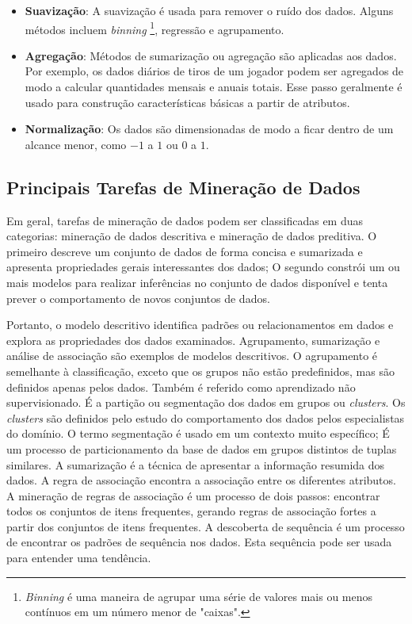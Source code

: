 \begin{itemize}
  \item 
  \textbf{Suavização}: A suavização é usada para remover o ruído dos dados. Alguns métodos incluem \textit{binning} \footnote{\textit{Binning} é uma maneira de agrupar uma série de valores mais ou menos contínuos em um número menor de "caixas".}, regressão e agrupamento.
  \item
\textbf{Agregação}: Métodos de sumarização ou agregação são aplicadas aos dados. Por exemplo, os dados diários de tiros de um jogador podem ser agregados de modo a calcular quantidades mensais e anuais totais. Esse passo geralmente é usado para  construção características básicas a partir de atributos.
  \item 
\textbf{Normalização}: Os dados são dimensionadas de modo a ficar dentro de um alcance menor, como $-1$ a $1$ ou $0$ a $1$.
\end{itemize}

\subsection{Principais Tarefas de Mineração de Dados}
Em geral, tarefas de mineração de dados podem ser classificadas em duas categorias: mineração de dados descritiva e mineração de dados preditiva. O primeiro descreve um conjunto de dados de forma concisa e sumarizada e apresenta propriedades gerais interessantes dos dados; O segundo constrói um ou mais modelos para realizar inferências no conjunto de dados disponível e tenta prever o comportamento de novos conjuntos de dados.

Portanto, o modelo descritivo identifica padrões ou relacionamentos em dados e explora as propriedades dos dados examinados. Agrupamento, sumarização e análise de associação são exemplos de modelos descritivos. O agrupamento é semelhante à classificação, exceto que os grupos não estão predefinidos, mas são definidos apenas pelos dados. Também é referido como aprendizado não supervisionado. É a partição ou segmentação dos dados em grupos ou \textit{clusters}. Os \textit{clusters} são definidos pelo estudo do comportamento dos dados pelos especialistas do domínio. O termo segmentação é usado em um contexto muito específico; É um processo de particionamento da base de dados em grupos distintos de tuplas similares. A sumarização é a técnica de apresentar a informação resumida dos dados. A regra de associação encontra a associação entre os diferentes atributos. A mineração de regras de associação é um processo de dois passos: encontrar todos os conjuntos de itens frequentes, gerando regras de associação fortes a partir dos conjuntos de itens frequentes. A descoberta de sequência é um processo de encontrar os padrões de sequência nos dados. Esta sequência pode ser usada para entender uma tendência.

